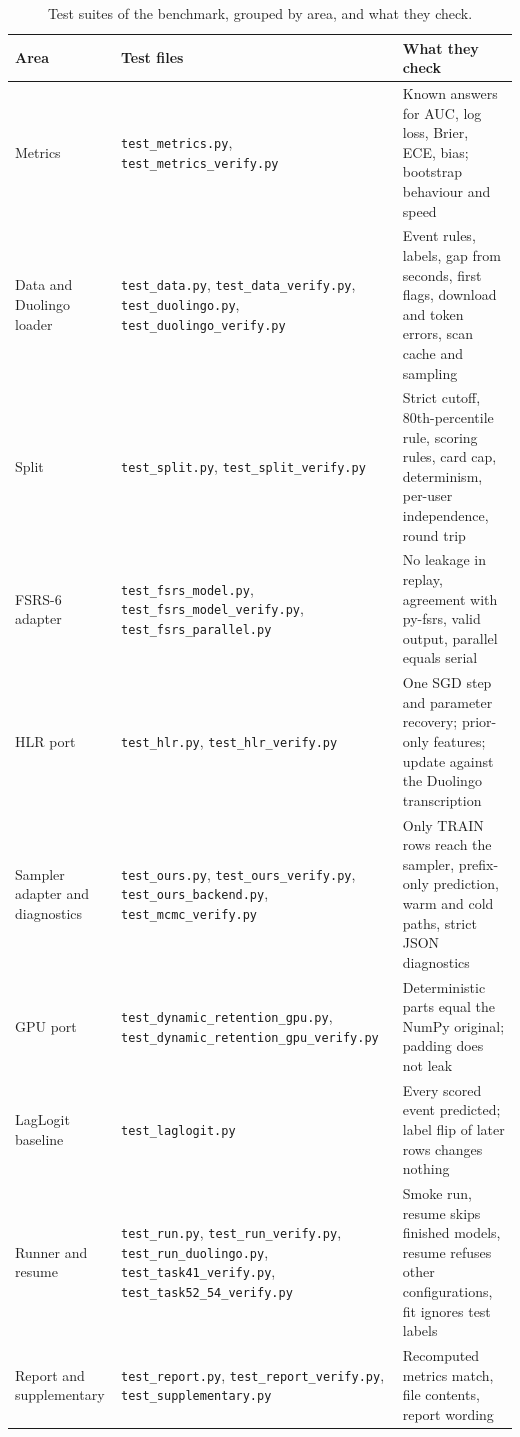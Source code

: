\begin{table}[htbp]
  \centering
  \caption{Test suites of the benchmark, grouped by area, and what they check.}
  \label{tab:tests}
  \begin{tabular}{@{}>{\raggedright\arraybackslash}p{3.2cm}>{\raggedright\arraybackslash}p{6.0cm}>{\raggedright\arraybackslash}p{4.6cm}@{}}
    \toprule
    \textbf{Area} & \textbf{Test files} & \textbf{What they check}\\
    \midrule
    Metrics & \texttt{test\_metrics.py}, \texttt{test\_metrics\_verify.py} & Known answers for AUC, log loss, Brier, ECE, bias; bootstrap behaviour and speed\\
    Data and Duolingo loader & \texttt{test\_data.py}, \texttt{test\_data\_verify.py}, \texttt{test\_duolingo.py}, \texttt{test\_duolingo\_verify.py} & Event rules, labels, gap from seconds, first flags, download and token errors, scan cache and sampling\\
    Split & \texttt{test\_split.py}, \texttt{test\_split\_verify.py} & Strict cutoff, 80th-percentile rule, scoring rules, card cap, determinism, per-user independence, round trip\\
    FSRS-6 adapter & \texttt{test\_fsrs\_model.py}, \texttt{test\_fsrs\_model\_verify.py}, \texttt{test\_fsrs\_parallel.py} & No leakage in replay, agreement with py-fsrs, valid output, parallel equals serial\\
    HLR port & \texttt{test\_hlr.py}, \texttt{test\_hlr\_verify.py} & One SGD step and parameter recovery; prior-only features; update against the Duolingo transcription\\
    Sampler adapter and diagnostics & \texttt{test\_ours.py}, \texttt{test\_ours\_verify.py}, \texttt{test\_ours\_backend.py}, \texttt{test\_mcmc\_verify.py} & Only TRAIN rows reach the sampler, prefix-only prediction, warm and cold paths, strict JSON diagnostics\\
    GPU port & \texttt{test\_dynamic\_retention\allowbreak\_gpu.py}, \texttt{test\_dynamic\_retention\allowbreak\_gpu\allowbreak\_verify.py} & Deterministic parts equal the NumPy original; padding does not leak\\
    LagLogit baseline & \texttt{test\_laglogit.py} & Every scored event predicted; label flip of later rows changes nothing\\
    Runner and resume & \texttt{test\_run.py}, \texttt{test\_run\_verify.py}, \texttt{test\_run\_duolingo.py}, \texttt{test\_task41\_verify.py}, \texttt{test\_task52\_54\_verify.py} & Smoke run, resume skips finished models, resume refuses other configurations, fit ignores test labels\\
    Report and supplementary & \texttt{test\_report.py}, \texttt{test\_report\_verify.py}, \texttt{test\_supplementary.py} & Recomputed metrics match, file contents, report wording\\
    \bottomrule
  \end{tabular}
\end{table}

